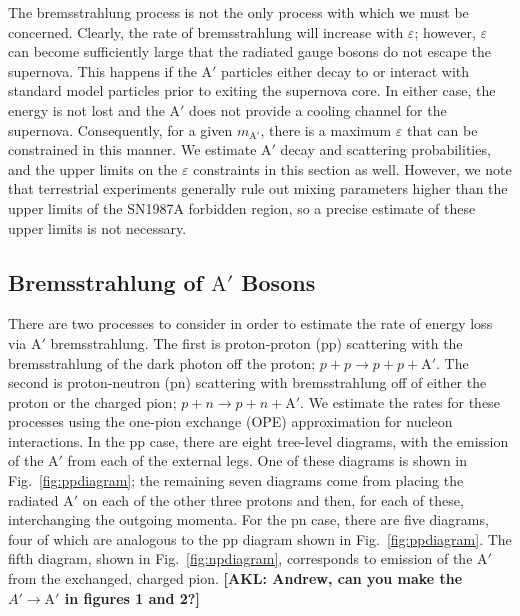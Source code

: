 \documentclass[nofootinbib,prd,superscriptaddress,twocolumn]{revtex4}
\newcommand{\Aprime}{\mathrm{A}'}
\newcommand{\akl}[1]{{{\bf{\color{Blue}[AKL: #1]}}}}
\begin{document}
The bremsstrahlung process is not the only process with which we must be concerned. Clearly, the rate of 
bremsstrahlung will increase with $\varepsilon$; however, $\varepsilon$ can become sufficiently large 
that the radiated gauge bosons do not escape the supernova. This happens if the $\Aprime$ particles 
either decay to or interact with standard model particles prior to exiting the supernova core. 
In either case, the energy is not lost and the $\Aprime$ does not provide a cooling channel for the supernova. 
Consequently, for a given $m_{\Aprime}$, there is a maximum $\varepsilon$ that can be constrained in this 
manner. We estimate $\Aprime$ decay and scattering probabilities, and the upper limits on the $\varepsilon$ 
constraints in this section as well. However, we note that terrestrial experiments generally rule out 
mixing parameters higher than the upper limits of the SN1987A forbidden region, so a precise estimate 
of these upper limits is not necessary.

\subsection{Bremsstrahlung of $\Aprime$ Bosons}

There are two processes to consider in order to estimate the rate of energy loss via $\Aprime$ bremsstrahlung. The first is  
proton-proton (pp) scattering with the bremsstrahlung of the dark photon off the proton; $p+p \rightarrow p+p+\Aprime$. 
The second is proton-neutron (pn) scattering with bremsstrahlung off of either the proton or the charged pion; 
$p+n \rightarrow p+n+\Aprime$. We estimate the rates for these processes using the one-pion exchange (OPE) 
approximation for nucleon interactions. In the pp case, there are eight tree-level diagrams, 
with the emission of the $\Aprime$ from each of the external legs. One of these diagrams is shown 
in Fig.~\ref{fig:ppdiagram}; the remaining seven diagrams come from placing the radiated $\Aprime$ 
on each of the other three protons and then, for each of these, interchanging the outgoing momenta. 
For the pn case, there are five diagrams, four of which are analogous to the pp diagram shown in 
Fig.~\ref{fig:ppdiagram}. The fifth diagram, shown in Fig.~\ref{fig:npdiagram}, corresponds to 
emission of the $\Aprime$ from the exchanged, charged pion. \akl{Andrew, can you make the $A' \to \mathrm{A'}$ in figures 1 and 2?}
\end{document}
